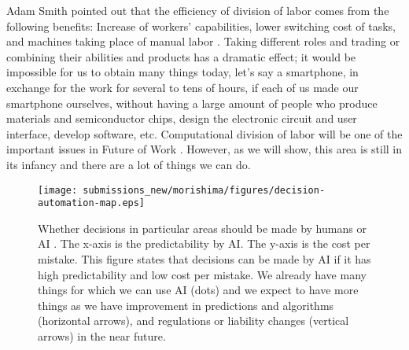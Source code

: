 Adam Smith pointed out that the efficiency of division of labor comes from the following benefits: Increase of workers' capabilities, lower switching cost of tasks, and machines taking place of manual labor \cite{Smi76}. 
Taking different roles and trading or combining their abilities and products has a dramatic effect; it would be impossible for us to obtain many things today, let's say a smartphone, in exchange for the work for several to tens of hours, if each of us made our smartphone ourselves, without having a large amount of people who produce materials and semiconductor chips, design the electronic circuit and user interface, develop software, etc.
Computational division of labor will be one of the important issues in Future of Work \cite{Sih+20}.
However, as we will show, this area is still in its infancy and there are a lot of things we can do.

\begin{figure}[t]
\centering
\texttt{[image: submissions\_new/morishima/figures/decision-automation-map.eps]}
\label{fig:decisions}
\caption{Whether decisions in particular areas should be made by humans or AI \cite{Dha16}. The x-axis is the predictability by AI. The y-axis is the cost per mistake.
This figure states that decisions can be made by AI if it has high predictability and low cost per mistake. We already have many things for which we can use AI (dots) and we expect to have more things as we have
improvement in predictions and algorithms (horizontal arrows), and regulations or liability changes (vertical arrows) in the near future.}
\end{figure}


